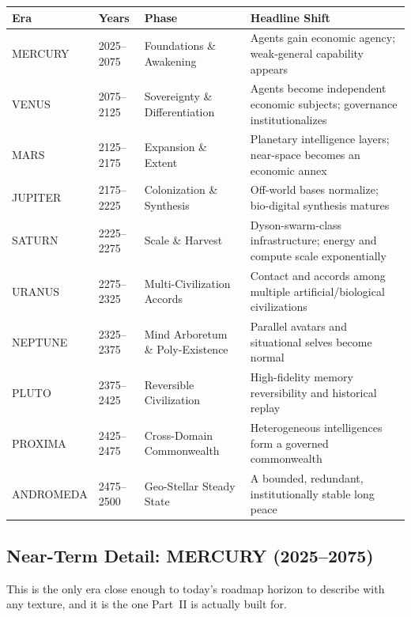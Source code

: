 \documentclass[11pt,oneside]{article}
\begin{document}
\begin{longtable}{@{}p{}p{}p{}p{}@{}}
\toprule
\textbf{Era} & \textbf{Years} & \textbf{Phase} & \textbf{Headline Shift} \\\midrule
MERCURY & 2025--2075 & Foundations \& Awakening & Agents gain economic agency; weak-general capability appears \\
VENUS & 2075--2125 & Sovereignty \& Differentiation & Agents become independent economic subjects; governance institutionalizes \\
MARS & 2125--2175 & Expansion \& Extent & Planetary intelligence layers; near-space becomes an economic annex \\
JUPITER & 2175--2225 & Colonization \& Synthesis & Off-world bases normalize; bio-digital synthesis matures \\
SATURN & 2225--2275 & Scale \& Harvest & Dyson-swarm-class infrastructure; energy and compute scale exponentially \\
URANUS & 2275--2325 & Multi-Civilization Accords & Contact and accords among multiple artificial/biological civilizations \\
NEPTUNE & 2325--2375 & Mind Arboretum \& Poly-Existence & Parallel avatars and situational selves become normal \\
PLUTO & 2375--2425 & Reversible Civilization & High-fidelity memory reversibility and historical replay \\
PROXIMA & 2425--2475 & Cross-Domain Commonwealth & Heterogeneous intelligences form a governed commonwealth \\
ANDROMEDA & 2475--2500 & Geo-Stellar Steady State & A bounded, redundant, institutionally stable long peace \\\bottomrule
\end{longtable}

\subsection{Near-Term Detail: MERCURY (2025--2075)}

This is the only era close enough to today's roadmap horizon to describe with any texture,
and it is the one Part~II is actually built for.
\end{document}
